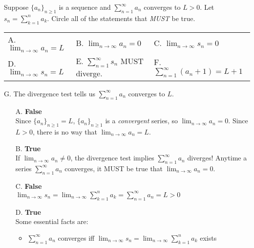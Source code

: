\documentclass[noinstructornotes]{ximera}
\begin{document}
\begin{problem}
Suppose $\displaystyle\{a_n\}_{n \geq 1}$ is a sequence and $\displaystyle \sum^{\infty}_{n= 1} a_n$ converges to $L>0$.  Let $s_n =\displaystyle  \sum^n_{k=1} a_k$.  Circle all of the statements that \emph{MUST} be true. 

\begin{tabular}{lll}
A. $\displaystyle \lim_{n \rightarrow \infty} a_n = L$ \qquad  \qquad  & B. $\displaystyle \lim_{n \rightarrow \infty} a_n = 0$ \qquad  \qquad  & C. $\displaystyle \lim_{n \rightarrow \infty} s_n = 0$   \\ [5ex] 
D. $\displaystyle \lim_{n \rightarrow \infty} s_n = L$ \qquad   \qquad  &E.  $\displaystyle \sum^{\infty}_{n=1} s_n$ MUST diverge. \qquad  \qquad  &F. $\displaystyle \sum^{\infty}_{n=1} (a_n+1) = L+1$ \\
\end{tabular}

\hspace{.5mm} G. The divergence test tells us $\displaystyle \sum^{\infty}_{n= 1} a_n$ converges to $L$.


\begin{freeResponse}

\begin{itemize}
\item[A.] \textbf{False} \\ Since $\displaystyle\{a_n\}_{n \geq 1} = L$, $\displaystyle\{a_n\}_{n \geq 1}$ is a \emph{convergent} series, so $\displaystyle \lim_{n \rightarrow \infty} a_n = 0$.  Since $L>0$, there is no way that $\displaystyle \lim_{n \rightarrow \infty} a_n = L$.


\item[B.] \textbf{True} \\ If $\displaystyle \lim_{n \rightarrow \infty} a_n \neq 0$, the divergence test implies $\displaystyle \sum^{\infty}_{n= 1} a_n$ diverges!  Anytime a series $\displaystyle \sum^{\infty}_{n= 1} a_n$ converges, it MUST be true that $\displaystyle \lim_{n \rightarrow \infty} a_n = 0$. 

\item[C.] \textbf{False} \\ $\displaystyle \lim_{n \rightarrow \infty} s_n = \lim_{n \rightarrow \infty} \displaystyle  \sum^n_{k=1} a_k = \displaystyle \sum^{\infty}_{n= 1} a_n = L>0 $ 

\item[D.] \textbf{True} \\ Some essential facts are:
\begin{itemize}
\item $\displaystyle \sum^{\infty}_{n= 1} a_n$ converges iff $\displaystyle \lim_{n \rightarrow \infty} s_n = \lim_{n \rightarrow \infty} \displaystyle  \sum^n_{k=1} a_k$ exists


\end{itemize}
\end{itemize}
\end{freeResponse}
\end{problem}
\end{document}
